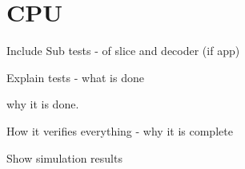
\section{CPU}

Include Sub tests - of slice and decoder (if app)

Explain tests - what is done

why it is done.

How it verifies everything - why it is complete

Show simulation results

